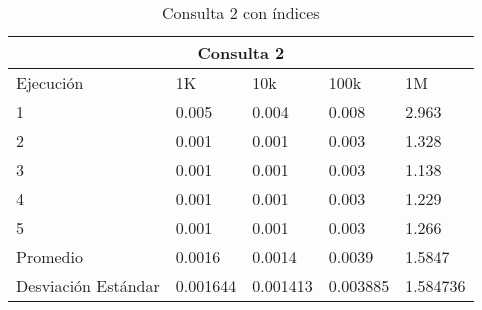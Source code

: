 \begin{table}%
\begin{center}%
\setlength{\tabcolsep}{0.3in}%
\begin{tabular}{|l|l|l|l|l|}%
\hline%
\multicolumn{5}{|c|}{Consulta 2}\\%
\hline%
Ejecución&1K&10k&100k&1M\\%
\hline%
1&0.005&0.004&0.008&2.963\\%
\hline%
2&0.001&0.001&0.003&1.328\\%
\hline%
3&0.001&0.001&0.003&1.138\\%
\hline%
4&0.001&0.001&0.003&1.229\\%
\hline%
5&0.001&0.001&0.003&1.266\\%
\hline%
Promedio&0.0016&0.0014&0.0039&1.5847\\%
\hline%
Desviación Estándar&0.001644&0.001413&0.003885&1.584736\\%
\hline%
\end{tabular}%
\end{center}%
\caption{Consulta 2 con índices}%
\end{table}